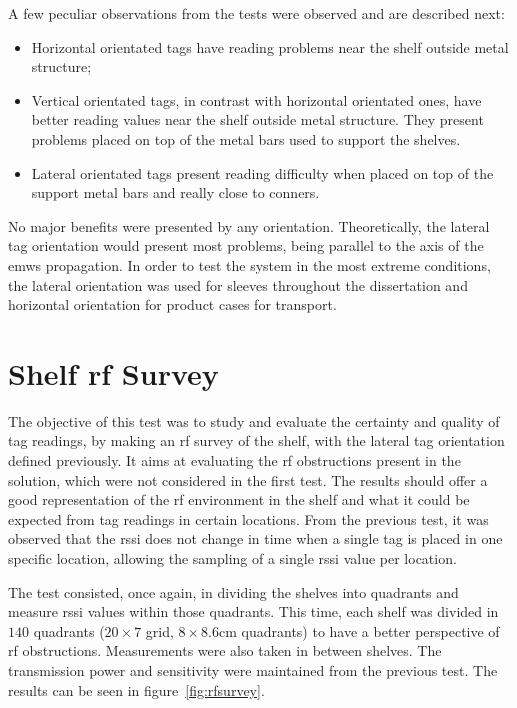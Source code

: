 A few peculiar observations from the tests were observed and are described next:

\begin{itemize}
    \item Horizontal orientated tags have reading problems near the shelf outside metal structure;
    \item Vertical orientated tags, in contrast with horizontal orientated ones, have better reading values near the shelf outside metal structure. They present problems placed on top of the metal bars used to support the shelves.
    \item Lateral orientated tags present reading difficulty when placed on top of the support metal bars and really close to conners.
\end{itemize}

No major benefits were presented by any orientation.
Theoretically, the lateral tag orientation would present most problems, being parallel to the axis of the \acp{emw} propagation.
In order to test the system in the most extreme conditions, the lateral orientation was used for sleeves throughout the dissertation and horizontal orientation for product cases for transport.

\section{Shelf \acs{rf} Survey}

The objective of this test was to study and evaluate the certainty and quality of tag readings, by making an \ac{rf} survey of the shelf, with the lateral tag orientation defined previously.
It aims at evaluating the \ac{rf} obstructions present in the solution, which were not considered in the first test.
The results should offer a good representation of the \ac{rf} environment in the shelf and what it could be expected from tag readings in certain locations. 
From the previous test, it was observed that the \ac{rssi} does not change in time when a single tag is placed in one specific location, allowing the sampling of a single \ac{rssi} value per location. 

The test consisted, once again, in dividing the shelves into quadrants and measure \ac{rssi} values within those quadrants. This time, each shelf was divided in $140$ quadrants ($20\times7$ grid, $8\times8.6$cm quadrants) to have a better perspective of \ac{rf} obstructions. Measurements were also taken in between shelves. The transmission power and sensitivity were maintained from the previous test.
The results can be seen in figure~\ref{fig:rfsurvey}.

